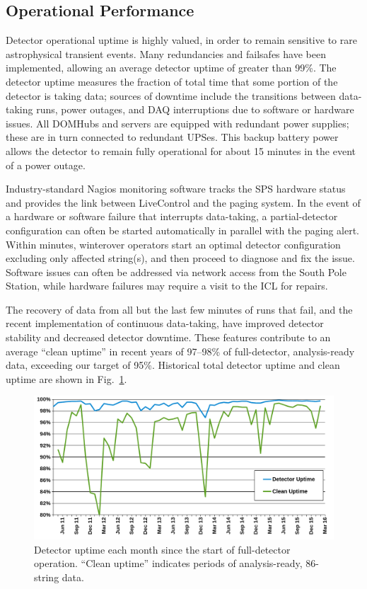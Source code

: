\subsection{\label{sec:operational_performance}Operational Performance}

Detector operational uptime is highly valued, in order to remain
sensitive to rare astrophysical transient events.  Many redundancies and
failsafes have been implemented, allowing an average detector uptime of greater
than 99\%. The detector uptime measures the fraction of total time
that some portion of the detector is taking data; sources of downtime
include the transitions between data-taking runs, power outages, and
DAQ interruptions due to software or hardware issues. All DOMHubs and servers are equipped with redundant power
supplies; these are in turn connected to redundant UPSes. This backup battery
power allows the detector to remain fully operational for about 15 minutes in the
event of a power outage.

Industry-standard Nagios monitoring software tracks the SPS hardware status and provides the link
between LiveControl and the paging system.  In the event of a hardware
or software failure that interrupts data-taking, a partial-detector configuration can
often be started automatically in parallel with the paging alert.
Within minutes, winterover operators start an optimal detector configuration
excluding only affected string(s), and then proceed to diagnose and fix the
issue.  Software issues can often be addressed via network access from the
South Pole Station, while hardware failures may require a visit to the ICL
for repairs.

The recovery of data from all but the last few minutes of runs that fail,
and the recent implementation of continuous data-taking, have improved
detector stability and decreased detector downtime. These features
contribute to an average ``clean uptime'' in recent years of 97--98\% of
full-detector, analysis-ready data, exceeding our target of 95\%.
Historical total detector uptime and clean uptime are shown in
Fig.~\ref{fig:clean-uptime}.   

\begin{figure}[!ht]
 \centering
 \includegraphics[width=1.0\textwidth]{graphics/uptime/clean-uptime.png}
 \caption{Detector uptime each month since the start of full-detector
   operation. ``Clean uptime'' indicates periods of analysis-ready,
   86-string data.} 
 \label{fig:clean-uptime}
\end{figure}

